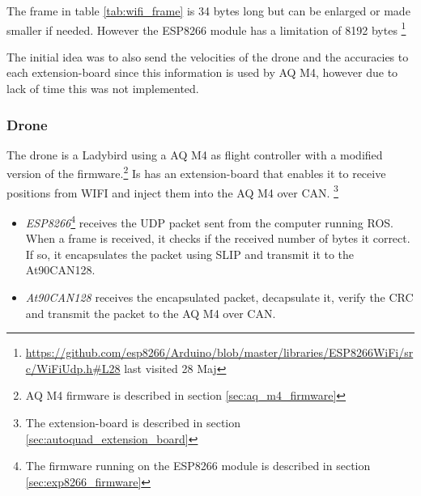 The frame in table \ref{tab:wifi_frame} is 34 bytes long but can be enlarged or made smaller if needed. However the ESP8266 module has a limitation of 8192 bytes \footnote{\url{https://github.com/esp8266/Arduino/blob/master/libraries/ESP8266WiFi/src/WiFiUdp.h\#L28} last visited 28 Maj}

The initial idea was to also send the velocities of the drone and the accuracies to each extension-board since this information is used by AQ M4, however due to lack of time this was not implemented.

\subsubsection*{Drone}
The drone is a Ladybird using a \ac{AQ} M4 as flight controller with a modified version of the firmware.\footnote{AQ M4 firmware is described in section \ref{sec:aq_m4_firmware}} Is has an extension-board that enables it to receive positions from WIFI and inject them into the \ac{AQ} M4 over \ac{CAN}. \footnote{The extension-board is described in section \ref{sec:autoquad_extension_board}}
\begin{itemize}
	\item \textit{ESP8266}\footnote{The firmware running on the ESP8266 module is described in section \ref{sec:exp8266_firmware}} receives the UDP packet sent from the computer running \ac{ROS}. When a frame is received, it checks if the received number of bytes it correct. If so, it encapsulates the packet using \ac{SLIP} and transmit it to the At90CAN128.
	\item \textit{At90CAN128} receives the encapsulated packet, decapsulate it, verify the CRC and transmit the packet to the \ac{AQ} M4 over \ac{CAN}.
\end{itemize}


